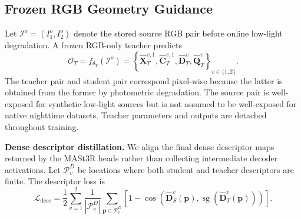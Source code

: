 \subsection{Frozen RGB Geometry Guidance}
\label{sec:method:distillation}

Let $\mathcal{I}^{o}=(I_1^{o},I_2^{o})$ denote the stored source RGB pair before
online low-light degradation.  A frozen RGB-only teacher predicts
\begin{equation}
\mathcal{O}_{T}
=f_{\theta_T}(\mathcal{I}^{o})
=\left\{
\hat{\mathbf{X}}_{T}^{v,1},
\hat{\mathbf{C}}_{T}^{v,1},
\hat{\mathbf{D}}_{T}^{v},
\hat{\mathbf{Q}}_{T}^{v}
\right\}_{v\in\{1,2\}}.
\label{eq:teacher_prediction}
\end{equation}
The teacher pair and student pair correspond pixel-wise because the latter is
obtained from the former by photometric degradation.  The source pair is
well-exposed for synthetic low-light sources but is not assumed to be
well-exposed for native nighttime datasets.  Teacher parameters and outputs
are detached throughout training.

\vspace{+5pt}
\noindent\textbf{Dense descriptor distillation.}
We align the final dense descriptor maps returned by the MASt3R heads rather
than collecting intermediate decoder activations.  Let
$\mathcal{P}^{D}_{v}$ be locations where both student and teacher descriptors
are finite.  The descriptor loss is
\begin{equation}
\mathcal{L}_{\mathrm{desc}}
=\frac{1}{2}\sum_{v=1}^{2}
\frac{1}{|\mathcal{P}^{D}_{v}|}
\sum_{\mathbf{p}\in\mathcal{P}^{D}_{v}}
\left[
1-\operatorname{cos}\!\left(
\hat{\mathbf{D}}_{S}^{v}(\mathbf{p}),
\operatorname{sg}(\hat{\mathbf{D}}_{T}^{v}(\mathbf{p}))
\right)
\right].
\label{eq:descriptor_distillation}
\end{equation}

